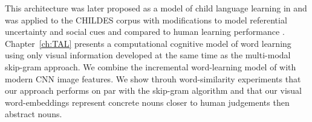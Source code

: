 This architecture was later proposed as a model of child language learning in and
was applied to the CHILDES corpus \cite{macwhinney2014childes} with modifications to model referential
uncertainty and social cues \cite{lazaridou2016multimodal} and compared to human learning performance \cite{lazaridou2017multimodal}.
Chapter~\ref{ch:TAL} presents a computational cognitive model of word learning using only
visual information developed at the same time as the multi-modal skip-gram approach. We combine
the incremental word-learning model of \cite{fazly.etal.10csj} with modern CNN image features.
We show throuh word-similarity experiments that our approach performs on par with the skip-gram
algorithm and that our visual word-embeddings represent concrete nouns closer to human judgements
then abstract nouns.



